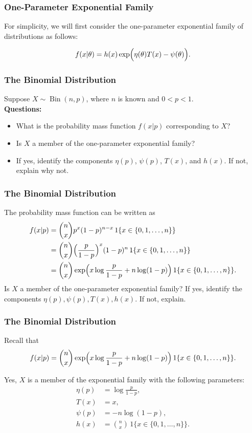 \documentclass{beamer}
\begin{document}
\begin{frame}
\frametitle{One-Parameter Exponential Family}

For simplicity, we will first consider the one-parameter exponential family of distributions as follows:

\[
f(x|\theta) = h(x)\exp\Bigl(\eta(\theta) T(x) - \psi(\theta)\Bigr).
\]
\end{frame}

\begin{frame}
\frametitle{The Binomial Distribution}
Suppose $X \sim \operatorname{Bin}(n,p)$, where $n$ is known and $0 < p < 1$.\\[1em]
\textbf{Questions:}
\begin{itemize}
  \item What is the probability mass function $f(x|p)$ corresponding to $X$?
  \item Is $X$ a member of the one-parameter exponential family?
  \item If yes, identify the components $\eta(p)$, $\psi(p)$, $T(x)$, and $h(x)$. If not, explain why not.
\end{itemize}
\end{frame}

\begin{frame}
\frametitle{The Binomial Distribution}
The probability mass function can be written as
\begin{align}
f(x|p) &= \binom{n}{x} p^x (1-p)^{n-x} \, 1\{x \in \{0,1,\dots,n\}\} \\
&=  \binom{n}{x}  \Big(\frac{p}{1-p}\Big)^x (1-p)^n \, 1\{x \in \{0,1,\dots,n\}\} \\
& = \binom{n}{x} \exp\Bigl( x\log\frac{p}{1-p} + n\log(1-p) \Bigr) \, 1\{x \in \{0,1,\dots,n\}\}.
\end{align}
Is $X$ a member of the one-parameter exponential family? If yes, identify the components $\eta(p), \psi(p), T(x), h(x).$ If not, explain. 
\end{frame}



\begin{frame}
\frametitle{The Binomial Distribution}

Recall that $$ f(x|p) = \binom{n}{x} \exp\Bigl( x\log\frac{p}{1-p} + n\log(1-p) \Bigr) \, 1\{x \in \{0,1,\dots,n\}\}.$$

Yes, $X$ is a member of the exponential family with the following parameters:
\begin{align*}
\eta(p) &= \log\frac{p}{1-p},\\[1mm]
T(x) &= x,\\[1mm]
\psi(p) &= -n\log(1-p),\\[1mm]
h(x) &= \binom{n}{x}\, 1\{x \in \{0,1,\dots,n\}\}.
\end{align*}
\end{frame}
\end{document}
